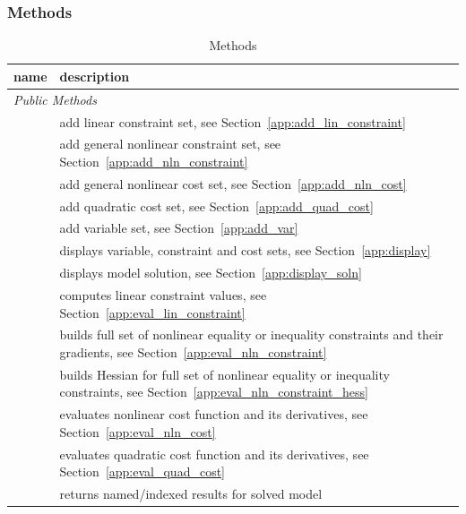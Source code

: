 \documentclass[12pt]{article}
\newcommand{\code}[1]{{\relsize{-0.5}{\tt{{#1}}}}}  %
\numberwithin{equation}{section}
\numberwithin{table}{section}
\numberwithin{figure}{section}
\begin{document}
\begin{appendices}
\subsubsection{Methods}

\begin{table}[!ht]
\centering
\begin{threeparttable}
\caption{\code{opt\_model} Methods}
\label{tab:methods_legacy}
\footnotesize
\begin{tabular}{lp{}}
\toprule
name & description \\
\midrule
\multicolumn{2}{l}{\emph{Public Methods}} \\
\code{~~add\_lin\_constraint}	& add linear constraint set, see Section~\ref{app:add_lin_constraint}	\\
\code{~~add\_nln\_constraint}	& add general nonlinear constraint set, see Section~\ref{app:add_nln_constraint}	\\
\code{~~add\_nln\_cost}	& add general nonlinear cost set, see Section~\ref{app:add_nln_cost}	\\
\code{~~add\_quad\_cost}	& add quadratic cost set, see Section~\ref{app:add_quad_cost}	\\
\code{~~add\_var}	& add variable set, see Section~\ref{app:add_var}	\\
\code{~~display}	& displays variable, constraint and cost sets, see Section~\ref{app:display}	\\
\code{~~display\_soln}	& displays model solution, see Section~\ref{app:display_soln}	\\
\code{~~eval\_lin\_constraint}	& computes linear constraint values, see Section~\ref{app:eval_lin_constraint}	\\
\code{~~eval\_nln\_constraint}	& builds full set of nonlinear equality or inequality constraints and their gradients, see Section~\ref{app:eval_nln_constraint}	\\
\code{~~eval\_nln\_constraint\_hess}	& builds Hessian for full set of nonlinear equality or inequality constraints, see Section~\ref{app:eval_nln_constraint_hess}	\\
\code{~~eval\_nln\_cost}	& evaluates nonlinear cost function and its derivatives\tnote{\ddag}, see Section~\ref{app:eval_nln_cost}	\\
\code{~~eval\_quad\_cost}	& evaluates quadratic cost function and its derivatives\tnote{\ddag}, see Section~\ref{app:eval_quad_cost}	\\
\code{~~get\_soln}	& returns named/indexed results for solved model	\\

\end{tabular}
\end{threeparttable}
\end{table}
\end{appendices}
\end{document}
